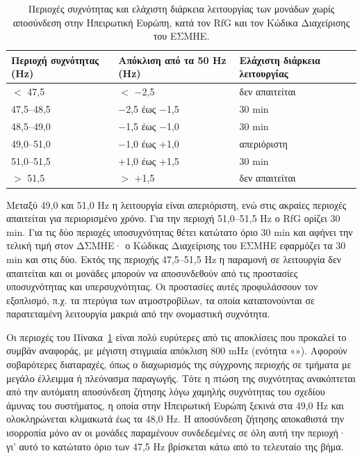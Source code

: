 \begin{table}[!htbp]
\centering
\begin{tabular}{lll}
\hline
\textbf{Περιοχή συχνότητας (Hz)} & \textbf{Απόκλιση από τα 50 Hz (Hz)}
& \textbf{Ελάχιστη διάρκεια λειτουργίας} \\
\hline
$<$ 47,5 & $<$ −2,5 & δεν απαιτείται \\
47,5--48,5 & −2,5 έως −1,5 & 30 min \\
48,5--49,0 & −1,5 έως −1,0 & 30 min \\
49,0--51,0 & −1,0 έως +1,0 & απεριόριστη \\
51,0--51,5 & +1,0 έως +1,5 & 30 min \\
$>$ 51,5 & $>$ +1,5 & δεν απαιτείται \\
\hline
\end{tabular}
\caption{Περιοχές συχνότητας και ελάχιστη διάρκεια λειτουργίας των μονάδων χωρίς αποσύνδεση
στην Ηπειρωτική Ευρώπη, κατά τον RfG και τον Κώδικα Διαχείρισης του ΕΣΜΗΕ.}
\label{tab:f-ranges}
\end{table}

Μεταξύ 49,0 και 51,0 Hz η λειτουργία είναι απεριόριστη, ενώ στις ακραίες περιοχές απαιτείται
για περιορισμένο χρόνο. Για την περιοχή 51,0--51,5 Hz ο RfG ορίζει 30 min. Για τις δύο
περιοχές υποσυχνότητας θέτει κατώτατο όριο 30 min και αφήνει την τελική τιμή στον ΔΣΜΗΕ· ο
Κώδικας Διαχείρισης του ΕΣΜΗΕ εφαρμόζει τα 30 min και στις δύο. Εκτός της περιοχής
47,5--51,5 Hz η παραμονή σε λειτουργία δεν απαιτείται και οι μονάδες μπορούν να αποσυνδεθούν
από τις προστασίες υποσυχνότητας και υπερσυχνότητας. Οι προστασίες αυτές προφυλάσσουν τον
εξοπλισμό, π.χ. τα πτερύγια των ατμοστροβίλων, τα οποία καταπονούνται σε παρατεταμένη
λειτουργία μακριά από την ονομαστική συχνότητα.

Οι περιοχές του Πίνακα~\ref{tab:f-ranges} είναι πολύ ευρύτερες από τις αποκλίσεις που
προκαλεί το συμβάν αναφοράς, με μέγιστη στιγμιαία απόκλιση 800 mHz (ενότητα
«»). Αφορούν σοβαρότερες διαταραχές, όπως ο διαχωρισμός της
σύγχρονης περιοχής σε τμήματα με μεγάλο έλλειμμα ή πλεόνασμα παραγωγής. Τότε η πτώση της
συχνότητας ανακόπτεται από την αυτόματη αποσύνδεση ζήτησης λόγω χαμηλής συχνότητας του
σχεδίου άμυνας του συστήματος, η οποία στην Ηπειρωτική Ευρώπη ξεκινά στα 49,0 Hz και
ολοκληρώνεται κλιμακωτά έως τα 48,0 Hz. Η αποσύνδεση ζήτησης αποκαθιστά την ισορροπία μόνο
αν οι μονάδες παραμένουν συνδεδεμένες σε όλη αυτή την περιοχή· γι' αυτό το κατώτατο όριο των
47,5 Hz βρίσκεται κάτω από το τελευταίο της βήμα.

